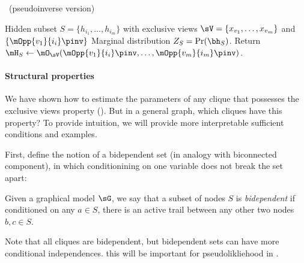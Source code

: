 \begin{algorithm}
  \caption{\LearnClique~(pseudoinverse version)}
  \label{algo:learnclique}
  \begin{algorithmic}
    \REQUIRE Hidden subset $S = \{ h_{i_1}, \dots, h_{i_m} \}$ with exclusive views $\sV = \{ x_{v_1}, \dots, x_{v_m} \}$
    and $\{\mOpp{v_1}{i_i}\pinv\}$ %
    \ENSURE Marginal distribution $Z_S = \Pr(\bh_S)$.
      \STATE Return $\mH_S \gets \mO_{\sV}( \mOpp{v_1}{i_i}\pinv, \dots, {\mOpp{v_m}{i_m}}\pinv )$.
  \end{algorithmic}
\end{algorithm}

\paragraph{Structural properties}

We have shown how to estimate the parameters of any clique that possesses the exclusive
  views property ().
  But in a general graph, which cliques have this property?
  To provide intuition, we will provide more interpretable sufficient conditions
  and examples.

First, define the notion of a bidependent set (in analogy with biconnected component),
in which conditionining on one variable does not break the set apart:
\begin{definition}
Given a graphical model $\sG$, we say that a subset of nodes $S$ is \emph{bidependent} if
conditioned on any $a \in S$, there is an active trail between any other two nodes $b,c \in S$.
\end{definition}
Note that all cliques are bidependent, but bidependent sets can have more conditional independences.
this will be important for pseudolikliehood in .

